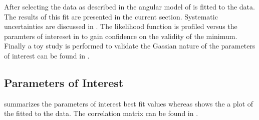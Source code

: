 After selecting the data as described in  the angular model of  is fitted to the data.
The results of this fit are presented in the current section. Systematic uncertainties are discussed in .
The likelihood function is profiled versus the paramters of intereset in  to gain confidence on the validity
of the minimum. Finally a toy study is performed to validate the Gassian nature of the parameters of interest can be found in
.

\subsection{Parameters of Interest}
\label{Parameters_of_Interest}

 summarizes the parameters
of interest best fit values whereas  shows the a plot of the fitted \pdf to the \BsJpsiKst data. The correlation matrix
can be found in .


